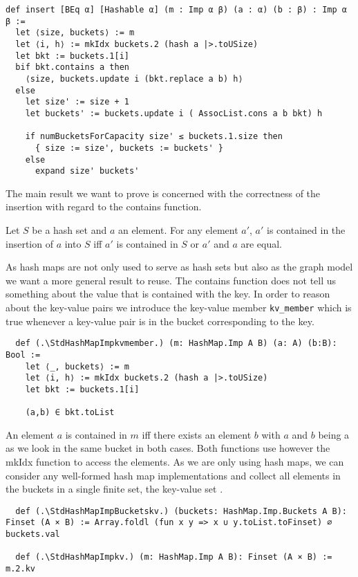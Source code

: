 \begin{lstlisting}
def insert [BEq α] [Hashable α] (m : Imp α β) (a : α) (b : β) : Imp α β :=
  let ⟨size, buckets⟩ := m
  let ⟨i, h⟩ := mkIdx buckets.2 (hash a |>.toUSize)
  let bkt := buckets.1[i]
  bif bkt.contains a then
    ⟨size, buckets.update i (bkt.replace a b) h⟩
  else
    let size' := size + 1
    let buckets' := buckets.update i ( AssocList.cons a b bkt) h

    if numBucketsForCapacity size' ≤ buckets.1.size then
      { size := size', buckets := buckets' }
    else
      expand size' buckets'
\end{lstlisting}

The main result we want to prove is concerned with the correctness of the insertion with regard to the contains function.

\begin{lemma}[\StdHashSetcontainsinsert]
  Let $S$ be a hash set and $a$ an element. For any element $a'$, $a'$ is contained in the insertion of $a$ into $S$ iff $a'$ is contained in $S$ or $a'$ and $a$ are equal.
\end{lemma}

As hash maps are not only used to serve as hash sets but also as the graph model we want a more general result to reuse. The contains function does not tell us something about the value that is contained with the key. In order to reason about the key-value pairs we introduce the key-value member \lstinline|kv_member| which is true whenever a key-value pair is in the bucket corresponding to the key.

\begin{lstlisting}
  def (.\StdHashMapImpkvmember.) (m: HashMap.Imp A B) (a: A) (b:B): Bool :=
    let ⟨_, buckets⟩ := m
    let ⟨i, h⟩ := mkIdx buckets.2 (hash a |>.toUSize)
    let bkt := buckets.1[i]

    (a,b) ∈ bkt.toList
\end{lstlisting}

An element $a$ is contained in $m$ iff there exists an element $b$ with $a$ and $b$ being a \StdHashMapImpkvmember as we look in the same bucket in both cases. Both functions use however the mkIdx function to access the elements. As we are only using hash maps, we can consider any well-formed hash map implementations and collect all elements in the buckets in a single finite set, the key-value set \StdHashMapImpkv.

\begin{lstlisting}
  def (.\StdHashMapImpBucketskv.) (buckets: HashMap.Imp.Buckets A B): Finset (A × B) := Array.foldl (fun x y => x ∪ y.toList.toFinset) ∅ buckets.val

  def (.\StdHashMapImpkv.) (m: HashMap.Imp A B): Finset (A × B) := m.2.kv
\end{lstlisting}

